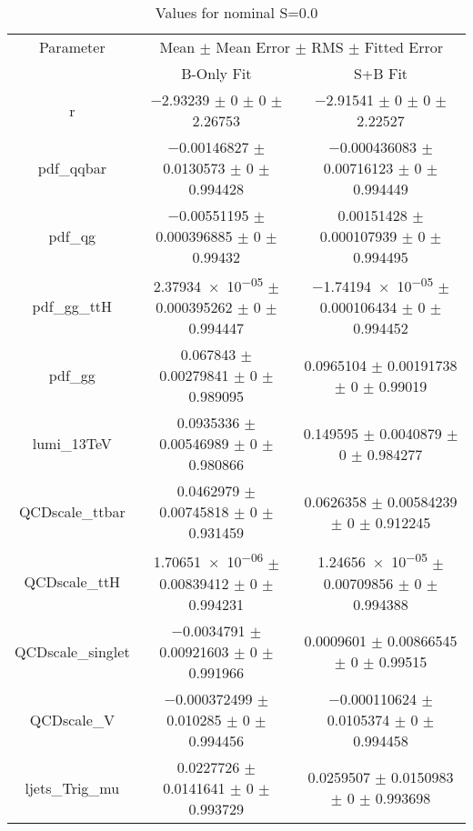 \begin{table}
\centering
\caption{Values for nominal S=0.0}
\begin{tabular}{ccc}
\toprule
Parameter & \multicolumn{2}{c}{Mean $\pm$ Mean Error $\pm$ RMS $\pm$ Fitted Error}\\
 & B-Only Fit & S+B Fit\\
\midrule
r & \num{-2.93239} $\pm$ \num{0} $\pm$ \num{0} $\pm$ \num{2.26753} & \num{-2.91541} $\pm$ \num{0} $\pm$ \num{0} $\pm$ \num{2.22527}\\
pdf\_qqbar & \num{-0.00146827} $\pm$ \num{0.0130573} $\pm$ \num{0} $\pm$ \num{0.994428} & \num{-0.000436083} $\pm$ \num{0.00716123} $\pm$ \num{0} $\pm$ \num{0.994449}\\
pdf\_qg & \num{-0.00551195} $\pm$ \num{0.000396885} $\pm$ \num{0} $\pm$ \num{0.99432} & \num{0.00151428} $\pm$ \num{0.000107939} $\pm$ \num{0} $\pm$ \num{0.994495}\\
pdf\_gg\_ttH & \num{2.37934e-05} $\pm$ \num{0.000395262} $\pm$ \num{0} $\pm$ \num{0.994447} & \num{-1.74194e-05} $\pm$ \num{0.000106434} $\pm$ \num{0} $\pm$ \num{0.994452}\\
pdf\_gg & \num{0.067843} $\pm$ \num{0.00279841} $\pm$ \num{0} $\pm$ \num{0.989095} & \num{0.0965104} $\pm$ \num{0.00191738} $\pm$ \num{0} $\pm$ \num{0.99019}\\
lumi\_13TeV & \num{0.0935336} $\pm$ \num{0.00546989} $\pm$ \num{0} $\pm$ \num{0.980866} & \num{0.149595} $\pm$ \num{0.0040879} $\pm$ \num{0} $\pm$ \num{0.984277}\\
QCDscale\_ttbar & \num{0.0462979} $\pm$ \num{0.00745818} $\pm$ \num{0} $\pm$ \num{0.931459} & \num{0.0626358} $\pm$ \num{0.00584239} $\pm$ \num{0} $\pm$ \num{0.912245}\\
QCDscale\_ttH & \num{1.70651e-06} $\pm$ \num{0.00839412} $\pm$ \num{0} $\pm$ \num{0.994231} & \num{1.24656e-05} $\pm$ \num{0.00709856} $\pm$ \num{0} $\pm$ \num{0.994388}\\
QCDscale\_singlet & \num{-0.0034791} $\pm$ \num{0.00921603} $\pm$ \num{0} $\pm$ \num{0.991966} & \num{0.0009601} $\pm$ \num{0.00866545} $\pm$ \num{0} $\pm$ \num{0.99515}\\
QCDscale\_V & \num{-0.000372499} $\pm$ \num{0.010285} $\pm$ \num{0} $\pm$ \num{0.994456} & \num{-0.000110624} $\pm$ \num{0.0105374} $\pm$ \num{0} $\pm$ \num{0.994458}\\
ljets\_Trig\_mu & \num{0.0227726} $\pm$ \num{0.0141641} $\pm$ \num{0} $\pm$ \num{0.993729} & \num{0.0259507} $\pm$ \num{0.0150983} $\pm$ \num{0} $\pm$ \num{0.993698}\\

\end{tabular}
\end{table}
